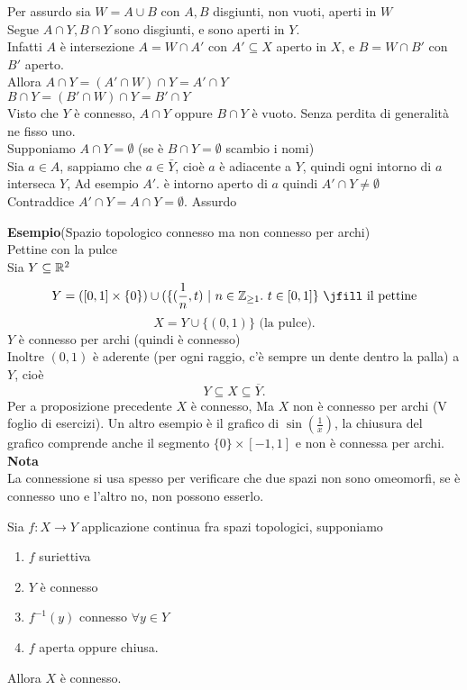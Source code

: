 \documentclass[12px]{article}
\begin{document}
\begin{dimo}
Per assurdo sia $W = A\cup B$ con $A,B$ disgiunti, non vuoti, aperti in  $W$\\
Segue $A\cap Y, B\cap Y$ sono disgiunti, e sono aperti in $Y$.\\
Infatti $A$ è intersezione $A = W \cap A'$ con  $A'\subseteq X$ aperto in  $X$, e  $B = W\cap B'$ con  $B'$ aperto.\\
Allora  $A\cap Y = (A'\cap W)\cap Y=A'\cap Y$\\ 
$B\cap Y = (B'\cap W)\cap Y = B'\cap Y$\\
Visto che  $Y$ è connesso, $A\cap Y$ oppure  $B\cap Y$ è vuoto. Senza perdita di generalità ne fisso uno.\\
Supponiamo  $A\cap Y = \emptyset$ (se è  $B\cap Y = \emptyset$ scambio i nomi)\\
Sia  $a\in A$, sappiamo che $a\in\bar Y$, cioè $a$ è adiacente a $Y$, quindi ogni intorno di  $a$ interseca $Y$, Ad esempio  $A'$. è intorno aperto di $a$ quindi $A'\cap Y\neq \emptyset$\\
Contraddice $A'\cap Y = A\cap Y = \emptyset$.  Assurdo\\
\end{dimo}
\textbf{Esempio}(Spazio topologico connesso ma non connesso per archi)\\
Pettine con la pulce\\
Sia $Y\subseteq \mathbb{R}^2$\\
\[Y = ([0,1]\times\{0\})\cup(\{(\frac 1n, t)\ |\ n\in\Z_{\geq 1} . \ t\in [0,1]\}\text{ \jfill il pettine}\]
\[
	X = Y\cup \{(0,1)\} \text{ (la pulce)}
.\] 
$Y$ è connesso per archi (quindi è connesso)\\
Inoltre $(0,1)$ è aderente (per ogni raggio, c'è sempre un dente dentro la palla) a  $Y$, cioè 
 \[
 Y\subseteq X\subseteq \overline Y
.\] 
Per a proposizione precedente $X$ è connesso, Ma $X$ non è connesso per archi (V foglio di esercizi).
Un altro esempio è il grafico di $\sin(\frac 1x)$, la chiusura del grafico comprende anche il segmento $\{0\}\times [-1,1]$ e non è connessa per archi.
 \textbf{Nota}\\
 La connessione si usa spesso per verificare che due spazi non sono omeomorfi, se è connesso uno e l'altro no, non possono esserlo.\\
 \begin{prop}
 	Sia $f:X \rightarrow Y$ applicazione continua fra spazi topologici, supponiamo
	\begin{enumerate}
		\item $f$ suriettiva
		\item $Y$ è connesso
		\item $f^{-1}(y)$ connesso  $\forall y\in Y$
		\item  $f$ aperta oppure chiusa.
	\end{enumerate}
	Allora $X$ è connesso.
 \end{prop}
\end{document}
